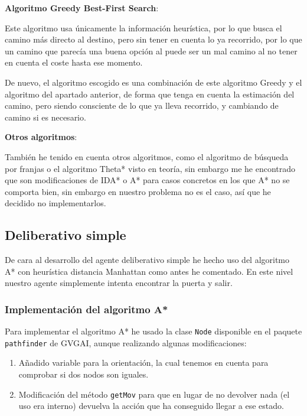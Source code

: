 \documentclass[10pt, spanish]{article}
\begin{document}
\textbf{Algoritmo Greedy Best-First Search}:

Este algoritmo usa únicamente la información heurística, por lo que busca el camino más directo al destino, pero sin tener en cuenta lo ya recorrido, por lo que un camino que parecía una buena opción al puede ser un mal camino al no tener en cuenta el coste hasta ese momento.

De nuevo, el algoritmo escogido es una combinación de este algoritmo Greedy y el algoritmo del apartado anterior, de forma que tenga en cuenta la estimación del camino, pero siendo consciente de lo que ya lleva recorrido, y cambiando de camino si es necesario.


\textbf{Otros algoritmos}:

También he tenido en cuenta otros algoritmos, como el algoritmo de búsqueda por franjas o el algoritmo Theta* visto en teoría, sin embargo me he encontrado que son modificaciones de IDA* o A* para casos concretos en los que A* no se comporta bien, sin embargo en nuestro problema no es el caso, así que he decidido no implementarlos.

\subsection{Deliberativo simple}

De cara al desarrollo del agente deliberativo simple he hecho uso del algoritmo A* con heurística distancia Manhattan como antes he comentado. En este nivel nuestro agente simplemente intenta encontrar la puerta y salir.

\subsubsection{Implementación del algoritmo A*}

Para implementar el algoritmo A* he usado la clase \texttt{Node} disponible en el paquete \texttt{pathfinder} de GVGAI, aunque realizando algunas modificaciones:

\begin{enumerate}
	\item Añadido variable para la orientación, la cual tenemos en cuenta para comprobar si dos nodos son iguales.
	\item Modificación del método \texttt{getMov} para que en lugar de no devolver nada (el uso era interno) devuelva la acción que ha conseguido llegar a ese estado.
\end{enumerate}
\end{document}

